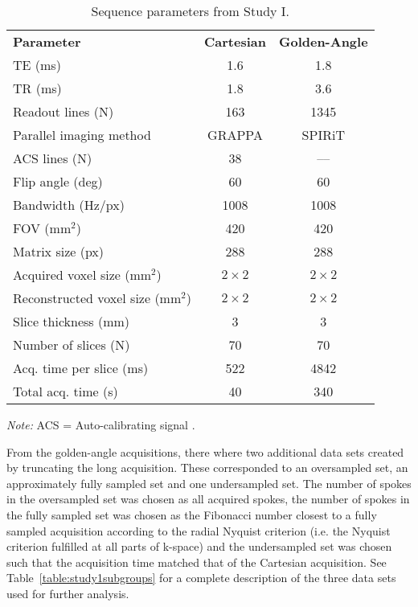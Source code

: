 \begin{table}[htbp]
\caption{Sequence parameters from Study I.}
\begin{center}
\begin{threeparttable}
\begin{tabular}{l c c}
     \mydarkrowcolor \textbf{Parameter} & \textbf{Cartesian} & \textbf{Golden-Angle}\\
     TE (ms) & 1.6 & 1.8   \\
     \myrowcolor TR (ms) & 1.8 & 3.6 \\
     Readout lines (N)  & 163 & 1345 \\
     \myrowcolor Parallel imaging method & GRAPPA & SPIRiT \\
     ACS lines (N) & 38 & –– \\
     \myrowcolor Flip angle (deg) & 60 & 60 \\
     Bandwidth (Hz/px) & 1008 & 1008 \\
     \myrowcolor FOV (mm$^2$) & 420 & 420 \\
     Matrix size (px) & 288 & 288 \\
     \myrowcolor Acquired voxel size (mm$^2$) & $2\times2$ & $2\times2$\\
     Reconstructed voxel size (mm$^2$) & $2\times2$ & $2\times2$\\
     \myrowcolor Slice thickness (mm) & 3 & 3\\
    Number of slices (N) & 70 & 70 \\
    \myrowcolor Acq. time per slice (ms) & 522 & 4842 \\
    Total acq. time (s) & 40 & 340 \\
     \bottomrule
\end{tabular}
\begin{tablenotes}
\emph{Note:} ACS = Auto-calibrating signal .
\end{tablenotes}
\end{threeparttable}
\end{center}
\label{table:study1protocol}
\end{table}
From the golden-angle acquisitions, there where two additional data sets created by truncating the long acquisition. These corresponded to an oversampled set, an approximately fully sampled set and one undersampled set. The number of spokes in the oversampled set was chosen as all acquired spokes, the number of spokes in the fully sampled set was chosen as the Fibonacci number closest to a fully sampled acquisition according to the radial Nyquist criterion (i.e. the Nyquist criterion fulfilled at all parts of k-space) and the undersampled set was chosen such that the acquisition time matched that of the Cartesian acquisition. See Table~\ref{table:study1subgroups} for a complete description of the three data sets used for further analysis.
